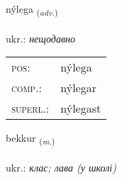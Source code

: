 \documentclass[frontgrid, backgrid]{flacards}\usepackage[]{graphicx}\usepackage[]{xcolor}
\begin{document}
\renewcommand{\flhead}{\vskip5pt \fboxsep=0pt {\small\bfseries\footnotesize Atviksorð | прислівник}}
\renewcommand{\fcfoot}{\vskip5pt \fboxsep=0pt \hspace{2pt}{\small\bfseries\footnotesize 2K}}

\renewcommand{\blhead}{\vskip5pt {\small\bfseries\footnotesize Atviksorð | прислівник }}
\renewcommand{\bcfoot}{\vskip5pt \hspace{2pt}{\small\bfseries\footnotesize 2K}}


{nýlega \small{\textsubscript{(\textit{adv.})}} \\[1ex] %
\textphonetic{[niːlɛɣa]} \\
ukr.: \emph{нещодавно} \\  [2ex]
\renewcommand*{\arraystretch}{0.8}
\begin{tabular}{ll}
\textsc{pos}: & nýlega \\ 
\textsc{comp.}: & nýlegar \\ 
\textsc{superl.}: & nýlegast \\
\end{tabular}
}

\renewcommand{\flhead}{\vskip5pt \fboxsep=0pt {\small\bfseries\footnotesize Nafnorð | іменник}}
\renewcommand{\fcfoot}{\vskip5pt \fboxsep=0pt \hspace{2pt}{\small\bfseries\footnotesize 2K}}

\renewcommand{\blhead}{\vskip5pt {\small\bfseries\footnotesize Nafnorð | іменник }}
\renewcommand{\bcfoot}{\vskip5pt \hspace{2pt}{\small\bfseries\footnotesize 2K}}


{bekkur \small{\textsubscript{(\textit{m.})}} \\[1ex] %
\textphonetic{[pɛhkʏr]} \\
ukr.: \emph{клас; лава (у школі)} \\  [2ex]
\renewcommand*{\arraystretch}{0.8}
}
\end{document}
